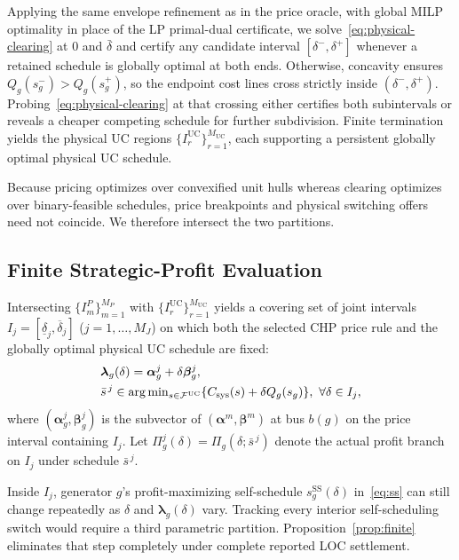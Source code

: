 \documentclass[journal]{IEEEtran}
\newcommand{\blambda}{\bm\lambda}
\newcommand{\UC}{\mathrm{UC}}
\newcommand{\SSched}{\mathrm{SS}}
\begin{document}
Applying the same envelope refinement as in the price oracle, with global MILP optimality in place of the LP primal-dual certificate, we solve~\eqref{eq:physical-clearing} at $0$ and $\bar{\delta}$ and certify any candidate interval $[\delta^-,\delta^+]$ whenever a retained schedule is globally optimal at both ends. Otherwise, concavity ensures $Q_g(s_g^-)>Q_g(s_g^+)$, so the endpoint cost lines cross strictly inside $(\delta^-,\delta^+)$. Probing~\eqref{eq:physical-clearing} at that crossing either certifies both subintervals or reveals a cheaper competing schedule for further subdivision. Finite termination yields the physical UC regions $\{I_r^{\UC}\}_{r=1}^{M_{\UC}}$, each supporting a persistent globally optimal physical UC schedule.

Because pricing optimizes over convexified unit hulls whereas clearing optimizes over binary-feasible schedules, price breakpoints and physical switching offers need not coincide. We therefore intersect the two partitions.

\subsection{Finite Strategic-Profit Evaluation}
Intersecting $\{I_m^P\}_{m=1}^{M_P}$ with $\{I_r^{\UC}\}_{r=1}^{M_{\UC}}$ yields a covering set of joint intervals $I_j=[\underline{\delta}_j,\overline{\delta}_j]$ ($j=1,\ldots,M_J$) on which both the selected CHP price rule and the globally optimal physical UC schedule are fixed:
\begin{align}
&\blambda_g(\delta) = \bm{\alpha}_g^j + \delta\bm{\beta}_g^j,\notag\\
&\bar{s}^{\,j} \in \arg\min\nolimits_{s\in\mathcal{F}^{\UC}}\{C_{\mathrm{sys}}(s) + \delta Q_g(s_g)\}, \ \forall\delta\in I_j,\label{eq:joint-region}
\end{align}
where $(\!\bm{\alpha}_g^j,\bm{\beta}_g^j\!)$ is the subvector of $(\!\bm{\alpha}^m,\bm{\beta}^m\!)$ at bus $b(g)$ on the price interval containing $I_j$. Let $\Pi_g^j\!(\delta)\!\!=\!\!\Pi_g\!(\delta;\bar{s}^{\,j})$ denote the actual profit branch on $I_j$ under schedule $\bar{s}^{\,j}$.

Inside $I_j$, generator $g$'s profit-maximizing self-schedule $s_g^{\SSched}(\delta)$ in~\eqref{eq:ss} can still change repeatedly as $\delta$ and $\blambda_g(\delta)$ vary. Tracking every interior self-scheduling switch would require a third parametric partition. Proposition~\ref{prop:finite} eliminates that step completely under complete reported LOC settlement.
\end{document}
